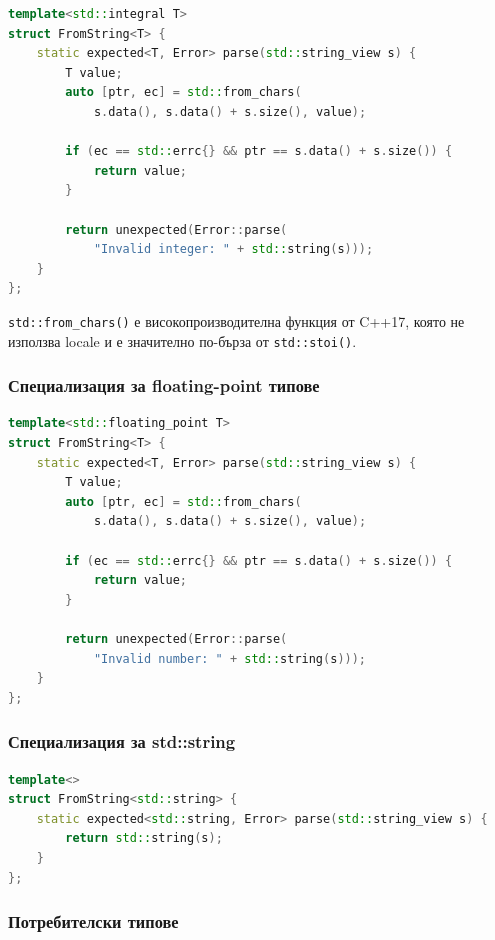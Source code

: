 \begin{lstlisting}[language=C++, basicstyle=\small\ttfamily, caption={FromString за integers}]
template<std::integral T>
struct FromString<T> {
    static expected<T, Error> parse(std::string_view s) {
        T value;
        auto [ptr, ec] = std::from_chars(
            s.data(), s.data() + s.size(), value);
        
        if (ec == std::errc{} && ptr == s.data() + s.size()) {
            return value;
        }
        
        return unexpected(Error::parse(
            "Invalid integer: " + std::string(s)));
    }
};
\end{lstlisting}

\texttt{std::from\_chars()} е високопроизводителна функция от C++17, която не използва locale и е значително по-бърза от \texttt{std::stoi()}.

\subsubsection{Специализация за floating-point типове}

\begin{lstlisting}[language=C++, basicstyle=\small\ttfamily, caption={FromString за floating-point}]
template<std::floating_point T>
struct FromString<T> {
    static expected<T, Error> parse(std::string_view s) {
        T value;
        auto [ptr, ec] = std::from_chars(
            s.data(), s.data() + s.size(), value);
        
        if (ec == std::errc{} && ptr == s.data() + s.size()) {
            return value;
        }
        
        return unexpected(Error::parse(
            "Invalid number: " + std::string(s)));
    }
};
\end{lstlisting}

\subsubsection{Специализация за std::string}

\begin{lstlisting}[language=C++, basicstyle=\small\ttfamily, caption={FromString за string}]
template<>
struct FromString<std::string> {
    static expected<std::string, Error> parse(std::string_view s) {
        return std::string(s);
    }
};
\end{lstlisting}

\subsubsection{Потребителски типове}

